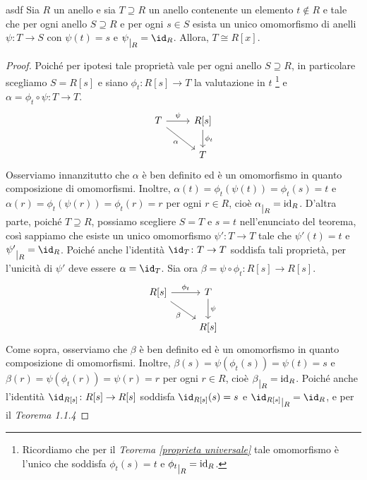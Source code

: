 \begin{teo}[]{asdf}
Sia $R$ un anello e sia $T\supseteq R$ un anello contenente un elemento $t\notin R$ e tale che per ogni anello $S\supseteq R$ e 
per ogni $s\in S$ esista un unico omomorfismo di anelli 
$\psi \colon T\to S$ con $\psi(t)=s$ e $\psi \raisebox{-.5em}{$\vert_{R}$}= \id_R$. Allora, $T\cong R[x]$.
\end{teo}
\vspace{-4mm}
\begin{proof}Poiché per ipotesi tale proprietà vale per ogni anello $S\supseteq R$, 
in particolare scegliamo $S=R[s]$ e siano $\phi_t\colon R[s]\to T$ la valutazione in $t$
\footnote{Ricordiamo che per il \emph{Teorema \ref{proprieta universale}} tale omomorfismo è l'unico che soddisfa 
$\phi_t(s)=t$ e $\phi_t \raisebox{-.5em}{$\vert_{R}$}= \operatorname{id}_R$.} e $\alpha=\phi_t\circ \psi\colon T\to T$. 
\vspace{-2mm}
\[
  \begin{tikzcd}
    T \arrow{r}{\psi} \arrow[swap]{dr}{\alpha} & R[s] \arrow{d}{\phi_t} \\
     & T
  \end{tikzcd}
\]
Osserviamo innanzitutto che $\alpha$ è ben definito ed è un omomorfismo in quanto composizione di omomorfismi. 
Inoltre, $\alpha(t) = \phi_t(\psi(t)) = \phi_t(s)=t$ e $\alpha(r)=\phi_t(\psi(r))=\phi_t(r)=r$ 
per ogni $r\in R$, cioè $\alpha \raisebox{-.5em}{$\vert_{R}$}= \operatorname{id}_R$. 
D'altra parte, poiché $T\supseteq R$, possiamo scegliere $S=T$ e $s=t$ nell'enunciato del teorema, 
così sappiamo che esiste un unico omomorfismo $\psi'\colon T\to T$ 
tale che $\psi'(t)=t$ e $\psi' \raisebox{-.5em}{$\vert_{R}$}= \id_R$. 
Poiché anche l'identità $\id_T\colon T\to T$ soddisfa tali proprietà, 
per l'unicità di $\psi'$ deve essere $\alpha=\id_T$. Sia ora $\beta=\psi\circ \phi_t\colon R[s]\to R[s]$.
\vspace{-2mm}
\[
  \begin{tikzcd}
    R[s] \arrow{r}{\phi_t} \arrow[swap]{dr}{\beta} & T \arrow{d}{\psi} \\
     & R[s]
  \end{tikzcd}
\]
Come sopra, osserviamo che $\beta$ è ben definito ed è un omomorfismo in quanto composizione di omomorfismi. 
Inoltre, $\beta(s) = \psi(\phi_t(s)) = \psi(t)=s$ e $\beta(r)=\psi(\phi_t(r))=\psi(r)=r$ 
per ogni $r\in R$, cioè $\beta \raisebox{-.5em}{$\vert_{R}$}= \operatorname{id}_R$. 
Poiché anche l'identità $\id_{R[s]}\colon R[s]\to R[s]$ soddisfa $\id_{R[s]}(s)=s$ 
e $\id_{R[s]} \raisebox{-.5em}{$\vert_{R}$}= \id_R$, e per il \emph{Teorema 1.1.4} 

\end{proof}

